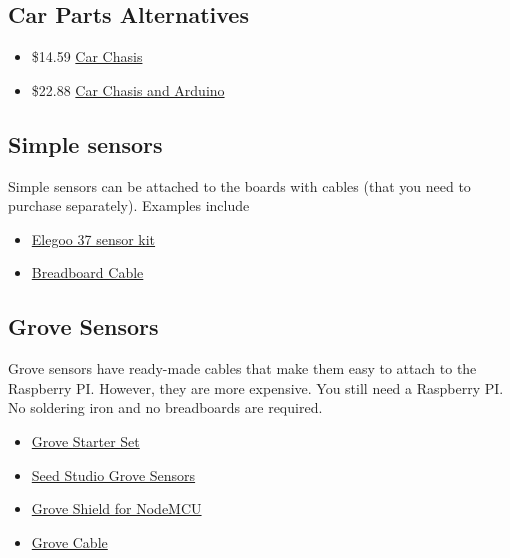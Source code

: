 \subsection{Car Parts Alternatives}\label{car-parts-alternatives}

\begin{itemize}

\item
  \$14.59
  \href{https://www.amazon.com/Ardokit-Chassis-Encoder-Battery-Arduino/dp/B00K5OWHXO/ref=sr_1_3?s=electronics\&ie=UTF8\&qid=1499251712\&sr=1-3\&keywords=robot+car}{Car
  Chasis}
\item
  \$22.88
  \href{https://www.amazon.com/VKmaker-Avoidance-tracking-Chassis-Ultrasonic/dp/B01CXVA6IO/ref=sr_1_6?s=electronics\&ie=UTF8\&qid=1499251770\&sr=1-6\&keywords=robot+car}{Car
  Chasis and Arduino}
\end{itemize}

\subsection{Simple sensors}\label{simple-sensors}

Simple sensors can be attached to the boards with cables (that you need
to purchase separately). Examples include

\begin{itemize}

\item
  \href{https://www.amazon.com/Elegoo-Sensor-Module-Arduino-MEGA/dp/B009OVGKTQ/ref=sr_1_5?s=electronics\&ie=UTF8\&qid=1500678010\&sr=1-5\&keywords=grove+sensor}{Elegoo
  37 sensor kit}
\item
  \href{https://www.amazon.com/Breadboard-Wires-Aoyoho-Multicolored-Jumper/dp/B01GK2Q4ZQ/ref=sr_1_1?s=electronics\&ie=UTF8\&qid=1500678142\&sr=1-1\&keywords=bread+board+cab\%3Be}{Breadboard
  Cable}
\end{itemize}

\subsection{Grove Sensors}\label{grove-sensors}

Grove sensors have ready-made cables that make them easy to attach to
the Raspberry PI. However, they are more expensive. You still need a
Raspberry PI. No soldering iron and no breadboards are required.

\begin{itemize}

\item
  \href{https://www.seeedstudio.com/Grove-Starter-Kit-for-Arduino-p-1855.html}{Grove
  Starter Set}
\item
  \href{https://www.seeedstudio.com/category/Grove-c-1003.html}{Seed
  Studio Grove Sensors}
\item
  \href{https://www.seeedstudio.com/Grove-Base-Shield-for-NodeMCU-p-2513.html}{Grove
  Shield for NodeMCU}
\item
  \href{http://www.switchdoc.com/2016/02/tutorial-intro-to-grove-connectors-for-arduinoraspberry-pi-projects/}{Grove
  Cable}
\end{itemize}

